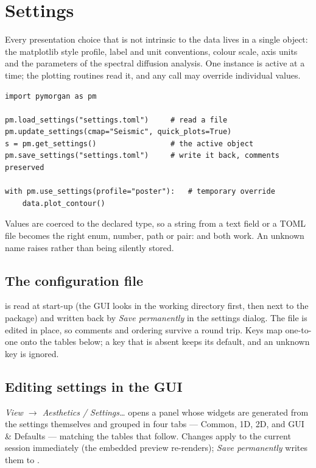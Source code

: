 \section{Settings}\label{sec:settings}

Every presentation choice that is not intrinsic to the data lives in a single
 object: the matplotlib style profile, label and unit
conventions, colour scale, axis units and the parameters of the spectral
diffusion analysis. One instance is active at a time; the plotting routines read
it, and any call may override individual values.

\begin{lstlisting}
import pymorgan as pm

pm.load_settings("settings.toml")     # read a file
pm.update_settings(cmap="Seismic", quick_plots=True)
s = pm.get_settings()                 # the active object
pm.save_settings("settings.toml")     # write it back, comments preserved

with pm.use_settings(profile="poster"):   # temporary override
    data.plot_contour()
\end{lstlisting}

Values are coerced to the declared type, so a string from a text field or a TOML
file becomes the right enum, number, path or pair:  and  both
work. An unknown name raises  rather than being silently stored.

\subsection{The configuration file}
 is read at start-up (the GUI looks in the working directory
first, then next to the package) and written back by \emph{Save permanently} in
the settings dialog. The file is edited in place, so comments and ordering
survive a round trip. Keys map one-to-one onto the tables below; a key that is
absent keeps its default, and an unknown key is ignored.

\subsection{Editing settings in the GUI}
\emph{View $\to$ Aesthetics / Settings\ldots} opens a panel whose widgets are
generated from the settings themselves and grouped in four tabs --- Common, 1D,
2D, and GUI \& Defaults --- matching the tables that follow. Changes apply to
the current session immediately (the embedded preview re-renders);
\emph{Save permanently} writes them to .

